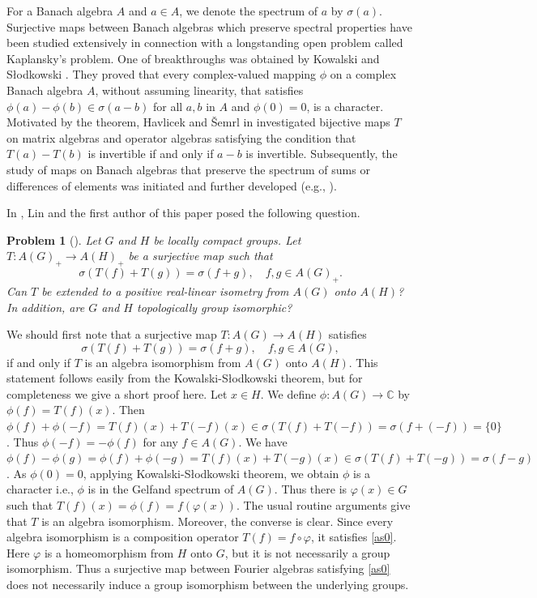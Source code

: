 \documentclass[10pt]{amsart}
\newtheorem{problem}[theorem]{Problem}
\begin{document}
For a Banach algebra $A$ and $a \in A$, we denote the spectrum of $a$ by $\sigma(a)$. Surjective maps between Banach algebras which preserve spectral properties have been studied extensively in connection with a longstanding open problem called Kaplansky's problem. One of breakthroughs was obtained by Kowalski and S\l odkowski \cite{KS}. They proved that every complex-valued mapping $\phi$ on a complex Banach algebra $A$, without assuming linearity, that satisfies $\phi(a)-\phi(b) \in \sigma(a-b)$ for all $a,b$ in $A$  and $\phi(0)=0$, is a character. Motivated by the theorem,  Havlicek and \v{S}emrl in \cite{HS} investigated bijective maps $T$ on matrix algebras and operator algebras satisfying the condition that $T(a)-T(b)$ is invertible if and only if $a-b$ is invertible. Subsequently, the study of maps on Banach algebras that preserve the spectrum of sums or differences of elements was initiated and further developed (e.g., \cite{ABS, BS, C, LO, MS}).  

In \cite{LO}, Lin and the first author of this paper posed the following question.  
\begin{problem}[{\cite[Problem 1.3]{LO}}]\label{prob}
Let $G$ and $H$ be locally compact groups. 
Let $T: A(G)_{+} \to A(H)_{+}$ be a surjective map such that 
\begin{equation} \label{as}
    \sigma(T(f)+T(g))=\sigma(f+g), \quad f, g \in A(G)_{+}.
\end{equation}
Can $T$ be extended to a positive real-linear isometry from $A(G)$ onto $A(H)$? In addition, are $G$ and $H$ topologically group isomorphic?
\end{problem}

We should first note that a surjective map $T: A(G) \to A(H)$ satisfies
\begin{equation} \label{as0}
    \sigma(T(f)+T(g))=\sigma(f+g), \quad f, g \in A(G),
\end{equation}
if and only if   $T$ is an algebra isomorphism from $A(G)$ onto $A(H)$. 
This statement follows easily from the Kowalski-S\l odkowski theorem, but for completeness we give a short proof here. Let $x \in H$. We define $\phi: A(G) \to \mathbb{C}$ by $\phi(f)=T(f)(x)$. Then $\phi(f)+\phi(-f)=T(f)(x)+T(-f)(x) \in \sigma(T(f)+T(-f))=\sigma(f+(-f))=\{0\}$. Thus $\phi(-f)=-\phi(f)$ for any $f \in A(G)$. We have $\phi(f)-\phi(g)=\phi(f)+\phi(-g)=T(f)(x)+T(-g)(x) \in \sigma(T(f)+T(-g))=\sigma(f-g)$. As $\phi(0)=0$, applying Kowalski-S\l odkowski theorem, we obtain $\phi$ is a character i.e., $\phi$ is in the Gelfand spectrum of $A(G)$. Thus there is $\varphi(x) \in G$ such that $T(f)(x)=\phi(f)=f(\varphi(x))$. The usual routine arguments give that $T$ is an algebra isomorphism. Moreover, the converse is clear. Since every algebra isomorphism is a composition operator $T(f)=f \circ \varphi$, it satisfies \eqref{as0}. Here $\varphi$ is a homeomorphism from $H$ onto $G$, but it is not necessarily a group isomorphism. Thus a surjective map  between Fourier algebras satisfying \eqref{as0} does not necessarily induce a group isomorphism between the underlying groups. 
\end{document}
